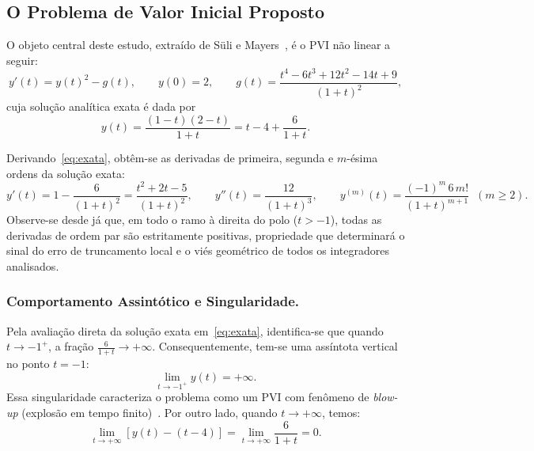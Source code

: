 \documentclass[12pt, a4paper]{article}
\begin{document}
\subsection{O Problema de Valor Inicial Proposto}
\label{sec:problema}

O objeto central deste estudo, extraído de Süli e Mayers~\cite{suli2003}, é o PVI
não linear a seguir:
\begin{equation}\label{eq:pvi}
  y'(t) = y(t)^2 - g(t), \qquad y(0) = 2, \qquad
  g(t) = \frac{t^4 - 6t^3 + 12t^2 - 14t + 9}{(1+t)^2},
\end{equation}
cuja solução analítica exata é dada por
\begin{equation}\label{eq:exata}
  y(t) = \frac{(1-t)(2-t)}{1+t} = t - 4 + \frac{6}{1+t}.
\end{equation}

Derivando~\eqref{eq:exata}, obtêm-se as derivadas de primeira, segunda e $m$-ésima ordens da solução exata:
\begin{equation}\label{eq:derivadas-exata}
  y'(t) = 1 - \frac{6}{(1+t)^2} = \frac{t^2 + 2t - 5}{(1+t)^2}, \qquad
  y''(t) = \frac{12}{(1+t)^3}, \qquad
  y^{(m)}(t) = \frac{(-1)^m\,6\,m!}{(1+t)^{m+1}} \;\;(m \ge 2).
\end{equation}
Observe-se desde já que, em todo o ramo à direita do polo ($t > -1$), todas as derivadas de ordem par são estritamente positivas, propriedade que determinará o sinal do erro de truncamento local e o viés geométrico de todos os integradores analisados.

\subsubsection{Comportamento Assintótico e Singularidade.}
\label{sec:intro-singularidade}
Pela avaliação direta da solução exata em~\eqref{eq:exata}, identifica-se que quando
$t \to -1^+$, a fração $\frac{6}{1+t} \to +\infty$. Consequentemente, tem-se uma
assíntota vertical no ponto $t = -1$:
\begin{equation}\label{eq:blowup}
  \lim_{t \to -1^+} y(t) = +\infty.
\end{equation}
Essa singularidade caracteriza o problema como um PVI com fenômeno de \emph{blow-up}
(explosão em tempo finito)~\cite{hairer1993,hirota2006,polyanin2018}.
Por outro lado, quando $t \to +\infty$, temos:
\begin{equation}\label{eq:assintota-infinita}
  \lim_{t \to +\infty} \left[ y(t) - (t - 4) \right] = \lim_{t \to +\infty} \frac{6}{1+t} = 0.
\end{equation}
\end{document}
